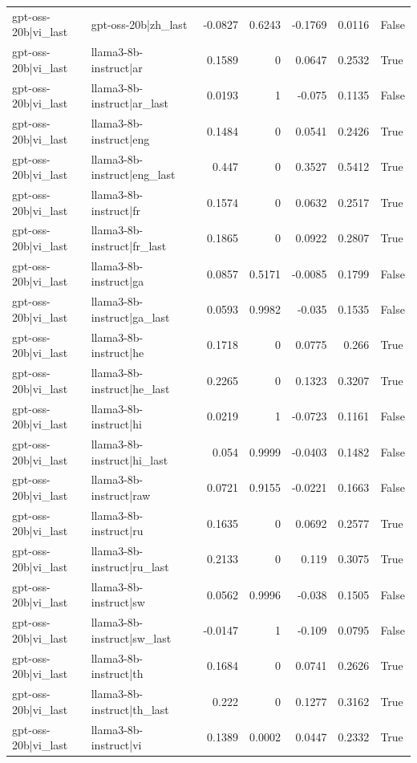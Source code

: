 \begin{table}
\begin{tabular}{l l r r r r l}
gpt-oss-20b|vi_last & gpt-oss-20b|zh_last & -0.0827 & 0.6243 & -0.1769 & 0.0116 & False \\
gpt-oss-20b|vi_last & llama3-8b-instruct|ar & 0.1589 & 0 & 0.0647 & 0.2532 & True \\
gpt-oss-20b|vi_last & llama3-8b-instruct|ar_last & 0.0193 & 1 & -0.075 & 0.1135 & False \\
gpt-oss-20b|vi_last & llama3-8b-instruct|eng & 0.1484 & 0 & 0.0541 & 0.2426 & True \\
gpt-oss-20b|vi_last & llama3-8b-instruct|eng_last & 0.447 & 0 & 0.3527 & 0.5412 & True \\
gpt-oss-20b|vi_last & llama3-8b-instruct|fr & 0.1574 & 0 & 0.0632 & 0.2517 & True \\
gpt-oss-20b|vi_last & llama3-8b-instruct|fr_last & 0.1865 & 0 & 0.0922 & 0.2807 & True \\
gpt-oss-20b|vi_last & llama3-8b-instruct|ga & 0.0857 & 0.5171 & -0.0085 & 0.1799 & False \\
gpt-oss-20b|vi_last & llama3-8b-instruct|ga_last & 0.0593 & 0.9982 & -0.035 & 0.1535 & False \\
gpt-oss-20b|vi_last & llama3-8b-instruct|he & 0.1718 & 0 & 0.0775 & 0.266 & True \\
gpt-oss-20b|vi_last & llama3-8b-instruct|he_last & 0.2265 & 0 & 0.1323 & 0.3207 & True \\
gpt-oss-20b|vi_last & llama3-8b-instruct|hi & 0.0219 & 1 & -0.0723 & 0.1161 & False \\
gpt-oss-20b|vi_last & llama3-8b-instruct|hi_last & 0.054 & 0.9999 & -0.0403 & 0.1482 & False \\
gpt-oss-20b|vi_last & llama3-8b-instruct|raw & 0.0721 & 0.9155 & -0.0221 & 0.1663 & False \\
gpt-oss-20b|vi_last & llama3-8b-instruct|ru & 0.1635 & 0 & 0.0692 & 0.2577 & True \\
gpt-oss-20b|vi_last & llama3-8b-instruct|ru_last & 0.2133 & 0 & 0.119 & 0.3075 & True \\
gpt-oss-20b|vi_last & llama3-8b-instruct|sw & 0.0562 & 0.9996 & -0.038 & 0.1505 & False \\
gpt-oss-20b|vi_last & llama3-8b-instruct|sw_last & -0.0147 & 1 & -0.109 & 0.0795 & False \\
gpt-oss-20b|vi_last & llama3-8b-instruct|th & 0.1684 & 0 & 0.0741 & 0.2626 & True \\
gpt-oss-20b|vi_last & llama3-8b-instruct|th_last & 0.222 & 0 & 0.1277 & 0.3162 & True \\
gpt-oss-20b|vi_last & llama3-8b-instruct|vi & 0.1389 & 0.0002 & 0.0447 & 0.2332 & True \\

\end{tabular}
\end{table}
